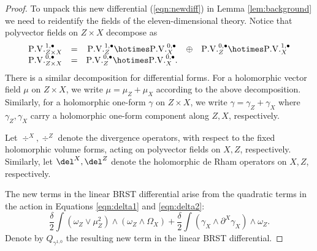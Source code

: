 \documentclass[11pt]{amsart}
\begin{document}
\begin{proof}
To unpack this new differential (\ref{eqn:newdiff}) in Lemma \ref{lem:background} we need to reidentify the fields of the eleven-dimensional theory.
Notice that polyvector fields on $Z \times X$ decompose as
\begin{equation}\label{eqn:decomposevf}
\begin{array}{ccccc}
  \PV^{1,\bu}_{Z \times X} & = & \PV^{1,\bu}_Z \hotimes \PV^{0,\bu}_X & \oplus & \PV^{0,\bu}_Z \hotimes \PV^{1,\bu}_X \\ 
  \PV^{0,\bu}_{Z \times X} & = & \PV^{0,\bu}_Z \hotimes \PV^{0,\bu}_X .
\end{array}
\end{equation}
There is a similar decomposition for differential forms.
For a holomorphic vector field $\mu$ on $Z \times X$, we write $\mu = \mu_Z + \mu_X$ according to the above decomposition. 
Similarly, for a holomorphic one-form $\gamma$ on $Z \times X$, we write $\gamma = \gamma_Z + \gamma_X$ where $\gamma_Z, \gamma_X$ carry a holomorphic one-form component along $Z,X$, respectively. 

Let $\div^X, \div^Z$ denote the divergence operators, with respect to the fixed holomorphic volume forms, acting on polyvector fields on $X,Z$, respectively. 
Similarly, let $\del^X, \del^Z$ denote the holomorphic de Rham operators on $X,Z$, respectively. 

The new terms in the linear BRST differential arise from the quadratic terms in the action in Equations \eqref{eqn:delta1} and \eqref{eqn:delta2}:
\begin{equation}\label{eqn:newterms}
  \frac{\delta}{2} \int (\omega_Z \vee \mu_Z^2) \wedge (\omega_Z \wedge \Omega_X) + \frac{\delta}{2} \int \left(\gamma_X \wedge \partial^X \gamma_X \right) \wedge \omega_Z .
\end{equation}
Denote by $Q_{\gamma^{1,0}}$ the resulting new term in the linear BRST differential. 




\end{proof}
\end{document}

